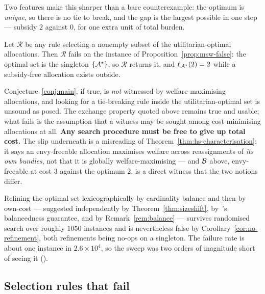 Two features make this sharper than a bare counterexample: the optimum is
\emph{unique}, so there is no tie to break, and the gap is the largest possible
in one step --- subsidy $2$ against $0$, for one extra unit of total burden.

\begin{corollary}
\label{cor:no-refinement}
Let $\mathcal{R}$ be any rule selecting a nonempty subset of the
utilitarian-optimal allocations. Then $\mathcal{R}$ fails on the instance of
Proposition~\ref{prop:msw-false}: the optimal set is the singleton
$\left\{\mathcal{A}^\star\right\}$, so $\mathcal{R}$ returns it, and
$\ell_{\mathcal{A}^\star}(2) = 2$ while a subsidy-free allocation exists outside.
\end{corollary}

\begin{remark}[Verdict]
\label{rem:msw-deadend}
Conjecture~\ref{conj:main}, if true, is \emph{not} witnessed by welfare-maximising
allocations, and looking for a tie-breaking rule inside the utilitarian-optimal
set is unsound as posed. The exchange property quoted above remains true and
usable; what fails is the assumption that a witness may be sought among
cost-minimising allocations at all. \textbf{Any search procedure must be free to
give up total cost.} The slip underneath is a misreading of
Theorem~\ref{thm:hs-characterisation}: it says an envy-freeable allocation
maximises welfare across reassignments of \emph{its own bundles}, not that it is
globally welfare-maximising --- and $\mathcal{B}$ above, envy-freeable at cost $3$
against the optimum $2$, is a direct witness that the two notions differ.
\end{remark}

\begin{remark}
\label{rem:double-refinement}
Refining the optimal set lexicographically by cardinality balance and then by
own-cost --- suggested independently by Theorem~\ref{thm:sizeshift},
by~\cite{BDNSV20}'s balancedness guarantee, and by Remark~\ref{rem:balance} ---
survives randomised search over roughly $1050$ instances and is nevertheless
false by Corollary~\ref{cor:no-refinement}, both refinements being no-ops on a
singleton. The failure rate is about one instance in $2.6 \times 10^4$, so the
sweep was two orders of magnitude short of seeing it ().
\end{remark}

\subsection{Selection rules that fail}
\label{sec:tiebreaks}


